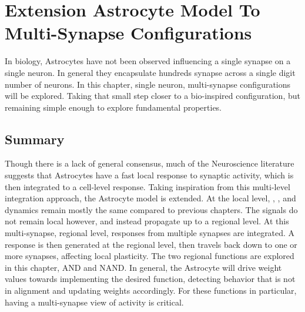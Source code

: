 \chapter{Extension Astrocyte Model To Multi-Synapse
  Configurations} \label{chapter:obj3}

In biology, Astrocytes have not been observed influencing a single synapse on a
single neuron. In general they encapsulate hundreds synapse across a single
digit number of neurons. In this chapter, single neuron, multi-synapse
configurations will be explored. Taking that small step closer to a bio-inspired
configuration, but remaining simple enough to explore fundamental properties.



  


\section{Summary}
Though there is a lack of general consensus, much of the Neuroscience literature
suggests that Astrocytes have a fast local response to synaptic activity, which
is then integrated to a cell-level response. Taking inspiration from this
multi-level integration approach, the Astrocyte model is extended. At the
local level, \ipt, \kp, and \ca dynamics remain mostly the same compared to
previous chapters. The \ca signals do not remain local however, and instead
propagate up to a regional level. At this multi-synapse, regional level, \ca
responses from multiple synapses are integrated. A response is then generated at
the regional level, then travels back down to one or more synapses, affecting
local plasticity. The two regional functions are explored in this
chapter, AND and NAND. In general, the Astrocyte will drive weight values
towards implementing the desired function, detecting behavior that is not in
alignment and updating weights accordingly. For these functions in particular,
having a multi-synapse view of activity is critical.


